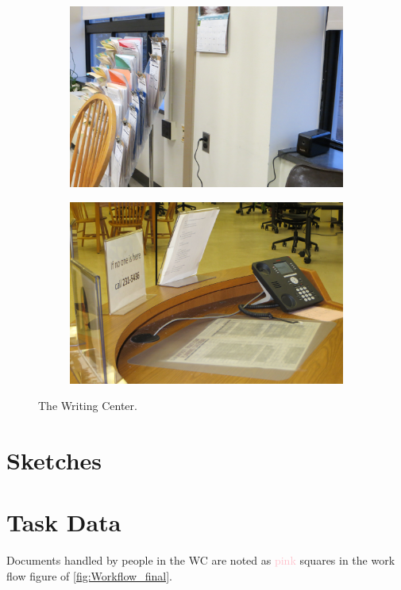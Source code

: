 \documentclass[12pt]{article} %
\begin{document}
\begin{samepage}
\begin{figure}[H]
\begin{subfigure}{.5\linewidth}
  \caption{}
  \label{fig:WC6}
  \end{subfigure}\\[1ex]
  \begin{subfigure}{.5\linewidth}
  \centering
  \includegraphics[width=0.75\linewidth]{WC7}
  \caption{}
  \label{fig:WC7}
  \end{subfigure}%
  \begin{subfigure}{.5\linewidth}
  \centering
  \includegraphics[width=0.75\linewidth]{WC8}
  \caption{}
  \label{fig:WC8}
  \end{subfigure}
  \caption{The Writing Center.}
  \label{fig:TheWritingCenter}
  \end{figure}
\end{samepage}

\section{Sketches} %

\section{Task Data} %
Documents handled by people in the WC are noted as \textcolor{pink}{pink} squares in the work flow figure of \ref{fig:Workflow_final}.
\end{document}
